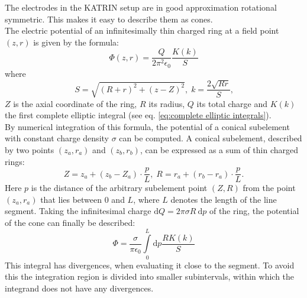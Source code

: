 	  The electrodes in the KATRIN setup are in good approximation rotational symmetric. This makes it easy to describe them as cones. \\	  The electric potential of an infinitesimally thin charged ring at a field point $(z,r)$ is given by the formula:
	  \begin{equation}
	  	\Phi(z,r) = \frac{Q}{2\pi^{2}\epsilon_{0}}\frac{K(k)}{S}
	  	\label{eq:potential charged ring}
	  \end{equation}
	  where
	  \begin{equation}
	  	S = \sqrt{(R+r)^2 +(z-Z)^2}\text{,} ~~k=\frac{2\sqrt{Rr}}{S}\text{,}
	  \end{equation}
	  $Z$ is the axial coordinate of the ring, $R$ its radius, $Q$ its total charge and $K(k)$ the first complete elliptic integral (see eq. \eqref{eq:complete elliptic integrals}). \\    By numerical integration of this formula, the potential of a conical subelement with constant charge density $\sigma$ can be computed. A conical subelement, described by two points $(z_a ,r_a)$ and $(z_b,r_b)$, can be expressed as a sum of thin charged rings:
	  \begin{equation}
	  	Z= z_a +(z_b -Z_a) \cdot \frac{p}{L}\text{,} ~~R= r_a +(r_b-r_a)\cdot\frac{p}{L}\text{.}
	  \end{equation}
	  Here $p$ is the distance of the arbitrary subelement point $(Z,R)$ from the point $(z_a,r_a)$ that lies between 0 and $L$, where $L$ denotes the length of the line segment. Taking the infinitesimal charge $\mathrm{d}Q=2\pi\sigma R~\mathrm{d}p$ of the ring, the potential of the cone can finally be described:
	  \begin{equation}
	  	\Phi = \frac{\sigma}{\pi\epsilon_0}\int\limits_{0}^{L} \mathrm{d}p\frac{RK(k)}{S}
	  	\label{ep:potential conical subelement}
	  \end{equation}
	  This integral has divergences, when evaluating it close to the segment. To avoid this the integration region is divided into smaller subintervals, within which the integrand does not have any divergences.	 

